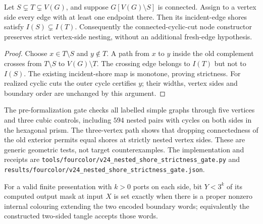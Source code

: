 \begin{lemma}
\label{lem:connected-exterior-strict-shore}
Let $S\subsetneq T\subsetneq V(G)$, and suppose $G[V(G)\setminus S]$
is connected.  Assign to a vertex side every edge with at least one endpoint
there.  Then its incident-edge shores satisfy $I(S)\subsetneq I(T)$.
Consequently the connected-cyclic-cut node constructor preserves strict
vertex-side nesting, without an additional fresh-edge hypothesis.
\end{lemma}

\begin{proof}
Choose $x\in T\setminus S$ and $y\notin T$.  A path from $x$ to $y$
inside the old complement crosses from $T\setminus S$ to $V(G)\setminus T$.
The crossing edge belongs to $I(T)$ but not to $I(S)$.  The existing
incident-shore map is monotone, proving strictness.  For realized cyclic
cuts the outer cycle certifies $y$; their widths, vertex sides and boundary
order are unchanged by this argument.
\end{proof}

The pre-formalization gate checks all labelled simple graphs through five
vertices and three cubic controls, including $594$ nested pairs with cycles
on both sides in the hexagonal prism.  The three-vertex path shows that
dropping connectedness of the old exterior permits equal shores at strictly
nested vertex sides.  These are generic geometric tests, not target
counterexamples.  The implementation and receipts are
\texttt{tools/fourcolor/v24\_nested\_shore\_strictness\_gate.py} and
\texttt{results/fourcolor/v24\_nested\_shore\_strictness\_gate.json}.

\begin{proposition}
\label{prop:presented-enumeration-literal-semantics}
For a valid finite presentation with $k>0$ ports on each side, bit $Y<3^k$
of its computed output mask at input $X$ is set exactly when there is a
proper nonzero internal colouring extending the two encoded boundary words;
equivalently the constructed two-sided tangle accepts those words.
\end{proposition}

